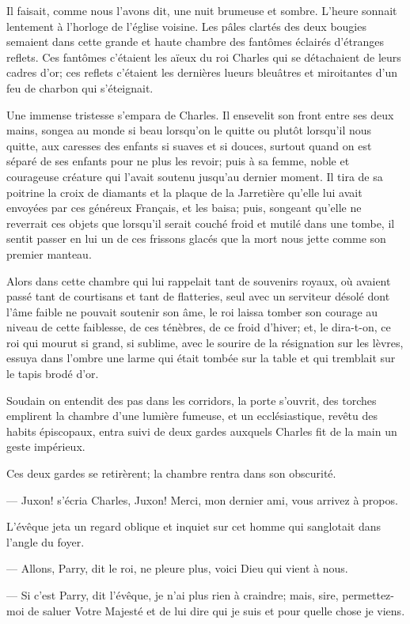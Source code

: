 Il faisait, comme nous l'avons dit, une nuit brumeuse et sombre. L'heure sonnait lentement à l'horloge de l'église voisine. Les pâles clartés des deux bougies semaient dans cette grande et haute chambre des fantômes éclairés d'étranges reflets. Ces fantômes c'étaient les aïeux du roi Charles qui se détachaient de leurs cadres d'or; ces reflets c'étaient les dernières lueurs bleuâtres et miroitantes d'un feu de charbon qui s'éteignait.

Une immense tristesse s'empara de Charles. Il ensevelit son front entre ses deux mains, songea au monde si beau lorsqu'on le quitte ou plutôt lorsqu'il nous quitte, aux caresses des enfants si suaves et si douces, surtout quand on est séparé de ses enfants pour ne plus les revoir; puis à sa femme, noble et courageuse créature qui l'avait soutenu jusqu'au dernier moment. Il tira de sa poitrine la croix de diamants et la plaque de la Jarretière qu'elle lui avait envoyées par ces généreux Français, et les baisa; puis, songeant qu'elle ne reverrait ces objets que lorsqu'il serait couché froid et mutilé dans une tombe, il sentit passer en lui un de ces frissons glacés que la mort nous jette comme son premier manteau.

Alors dans cette chambre qui lui rappelait tant de souvenirs royaux, où avaient passé tant de courtisans et tant de flatteries, seul avec un serviteur désolé dont l'âme faible ne pouvait soutenir son âme, le roi laissa tomber son courage au niveau de cette faiblesse, de ces ténèbres, de ce froid d'hiver; et, le dira-t-on, ce roi qui mourut si grand, si sublime, avec le sourire de la résignation sur les lèvres, essuya dans l'ombre une larme qui était tombée sur la table et qui tremblait sur le tapis brodé d'or.

Soudain on entendit des pas dans les corridors, la porte s'ouvrit, des torches emplirent la chambre d'une lumière fumeuse, et un ecclésiastique, revêtu des habits épiscopaux, entra suivi de deux gardes auxquels Charles fit de la main un geste impérieux.

Ces deux gardes se retirèrent; la chambre rentra dans son obscurité.

— Juxon! s'écria Charles, Juxon! Merci, mon dernier ami, vous arrivez à propos.

L'évêque jeta un regard oblique et inquiet sur cet homme qui sanglotait dans l'angle du foyer.

— Allons, Parry, dit le roi, ne pleure plus, voici Dieu qui vient à nous.

— Si c'est Parry, dit l'évêque, je n'ai plus rien à craindre; mais, sire, permettez-moi de saluer Votre Majesté et de lui dire qui je suis et pour quelle chose je viens.

